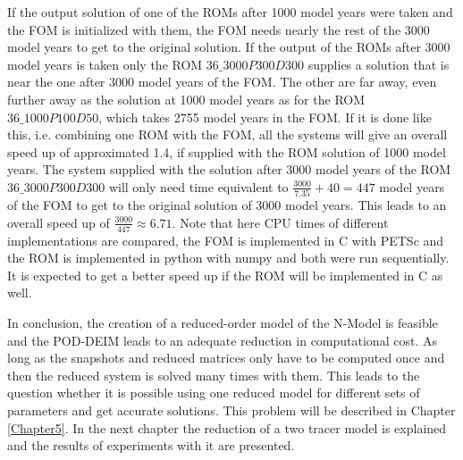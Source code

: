 If the output solution of one of the ROMs after 1000 model years were taken and the FOM is initialized with them, the FOM needs nearly the rest of the 3000 model years to
get to the original solution. If the output of the ROMs after 3000 model years is taken only the ROM $36\_3000P300D300$ supplies a solution that is
near the one after 3000 model years of the FOM. The other are far away, even further away as the solution at 1000 model years as for the
ROM $36\_1000P100D50$, which takes 2755 model years in the FOM. If it is done like this, i.e. combining one ROM with the FOM, all the systems will give an overall speed up of approximated 1.4, if supplied with the ROM solution of 1000 model years.
The system supplied with the solution after 3000 model years of the ROM $36\_3000P300D300$ will only need time equivalent to $\frac{3000}{7.35}  + 40 = 447$ model years of the FOM to get to the original solution of 3000 model years.
This leads to an overall speed up of $\frac{3000}{447} \approx 6.71$.
Note that here CPU times of different implementations are compared, the FOM is implemented in C with PETSc and the ROM is implemented in python with numpy and both were run sequentially.
It is expected to get a better speed up if the ROM will be implemented in C as well.

In conclusion, the creation of a reduced-order model of the N-Model is feasible and the POD-DEIM leads to an adequate reduction in
computational cost. As long as the snapshots and reduced matrices only have to be computed once and then the reduced system is solved
many times with them. This leads to the question whether it is possible using one reduced model for different sets of parameters and get accurate solutions.
This problem will be described in Chapter \ref{Chapter5}. In the next chapter the reduction of a two tracer model is explained and
the results of experiments with it are presented.




